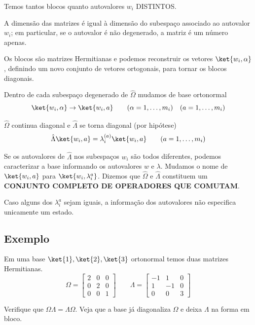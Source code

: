 Temos tantos blocos quanto autovalores $w_i$ DISTINTOS.

A dimensão das matrizes é igual à dimensão do subespaço associado ao autovalor $w_i$; em particular, se o autovalor é não degenerado, a matriz é um número apenas.

Os blocos são matrizes Hermitianas e podemos reconstruir os vetores $\ket{w_i, \alpha}$, definindo um novo conjunto de vetores ortogonais, para tornar os blocos diagonais.

Dentro de cada subespaço degenerado de $\hat{\Omega}$ mudamos de base ortonormal
\[
\ket{w_i, \alpha} \to \ket{w_i, a} \qquad (\alpha = 1, \dots, m_i) \quad (a = 1, \dots, m_i)
\]

$\hat{\Omega}$ continua diagonal e $\hat{\Lambda}$ se torna diagonal (por hipótese)
\begin{equation}
    \hat{\Lambda}\ket{w_i, a} = \lambda_i^{(a)} \ket{w_i, a} \qquad (a = 1, \dots, m_i)
\end{equation}

Se os autovalores de $\hat{\Lambda}$ nos subespaços $w_i$ são todos diferentes, podemos caracterizar a base informando os autovalores $w$ e $\lambda$. Mudamos o nome de $\ket{w_i, a}$ para $\ket{w_i, \lambda_i^a}$. Dizemos que $\hat{\Omega}$ e $\hat{\Lambda}$ constituem um \textbf{CONJUNTO COMPLETO DE OPERADORES QUE COMUTAM}.

Caso alguns dos $\lambda_i^a$ sejam iguais, a informação dos autovalores não especifica unicamente um estado.

\subsection*{Exemplo}

Em uma base $\ket{1}, \ket{2}, \ket{3}$ ortonormal temos duas matrizes Hermitianas.
\begin{equation}
    \Omega = \begin{bmatrix} 2 & 0 & 0 \\ 0 & 2 & 0 \\ 0 & 0 & 1 \end{bmatrix}
    \qquad
    \Lambda = \begin{bmatrix} -1 & 1 & 0 \\ 1 & -1 & 0 \\ 0 & 0 & 3 \end{bmatrix}
\end{equation}

Verifique que $\Omega\Lambda = \Lambda\Omega$. Veja que a base já diagonaliza $\Omega$ e deixa $\Lambda$ na forma em bloco.

